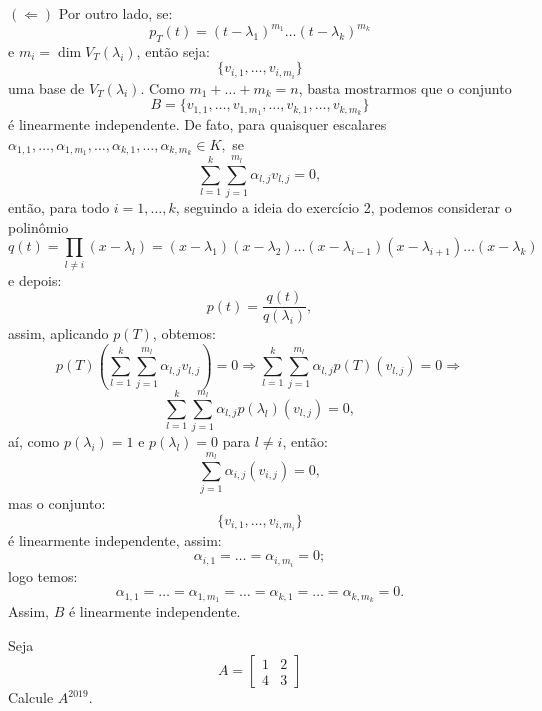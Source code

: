 \documentclass[11pt,a4paper]{article}
\begin{document}
{\bigskip
\noindent
$(\Leftarrow)$ Por outro lado, se:
\[
p_T(t)=(t-\lambda_1)^{m_1}\dots(t-\lambda_k)^{m_k}
\]
e $m_i=\dim V_T(\lambda_i)$, então seja:
\[
\{v_{i,1},\dots,v_{i,m_i}\}
\]
uma base de $V_T(\lambda_i)$. Como $m_1+\dots+m_k=n$, basta mostrarmos que o conjunto
\[
B=\{v_{1,1},\dots,v_{1,m_1},\dots,v_{k,1},\dots,v_{k,m_k}\}
\]
é linearmente independente. De fato, para quaisquer escalares $\alpha_{1,1},\dots,\alpha_{1,m_1},\dots,\alpha_{k,1},\dots,\alpha_{k,m_k}\in K,$ se
\[
\sum_{l=1}^k\sum_{j=1}^{m_l}\alpha_{l,j}v_{l,j}=0,
\]
então, para todo $i=1,\dots,k$, seguindo a ideia do exercício 2, podemos considerar o polinômio
\[
q(t)=\prod_{l\neq i}(x-\lambda_l) = (x - \lambda_1)(x - \lambda_2) \ldots (x - \lambda_{i-1}) (x - \lambda_{i+1}) \ldots (x - \lambda_k)
\]
e depois:
\[
p(t)=\frac{q(t)}{q(\lambda_i)},
\]
assim, aplicando $p(T)$, obtemos:
\[
p(T)\left(\sum_{l=1}^k\sum_{j=1}^{m_l}\alpha_{l,j}v_{l,j}\right)=0 \Rightarrow
\sum_{l=1}^k\sum_{j=1}^{m_l}\alpha_{l,j}p(T)\left(v_{l,j}\right)=0 \Rightarrow\]\[
\sum_{l=1}^k\sum_{j=1}^{m_l}\alpha_{l,j}p(\lambda_l)\left(v_{l,j}\right)=0,
\]
aí, como $p(\lambda_i)=1$ e $p(\lambda_l)=0$ para $l\neq i$, então:
\[
\sum_{j=1}^{m_l}\alpha_{i,j}\left(v_{i,j}\right)=0,
\]
mas o conjunto:
\[
\{v_{i,1},\dots,v_{i,m_i}\}
\]
é linearmente independente, assim:
\[
\alpha_{i,1}=\dots=\alpha_{i,m_i}=0;
\]
logo temos:
\[
\alpha_{1,1}=\dots=\alpha_{1,m_1}=\dots=\alpha_{k,1}=\dots=\alpha_{k,m_k}=0.
\]
Assim, $B$ é linearmente independente.
}
   
  Seja
\[
A = \begin{bmatrix} 1 & 2 \\ 4 & 3 \end{bmatrix}
\]
Calcule $A^{2019}.$
    
\end{document}
